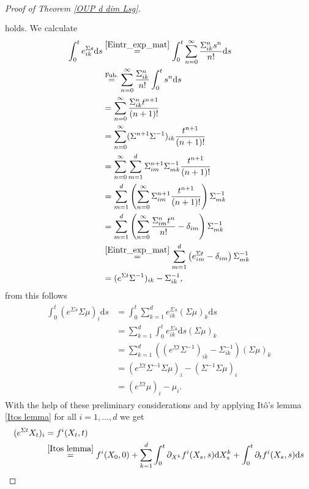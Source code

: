 \documentclass[11pt,titlepage]{article}
\theoremstyle{definition}
\theoremstyle{remark}
\begin{document}
\begin{proof}[Proof of Theorem \ref{OUP d dim Lsg}]
\begin{align}
\begin{split}
			\end{split}			
		\end{align}
		holds. We calculate
		\begin{align*}
			\int_0^t e^{\Sigma s}_{ik}\mathrm{d}s &\overset{\ref{Eintr_exp_mat}}{=} \int_0^t \sum_{n=0}^{\infty}\frac{\Sigma^n_{ik}s^n}{n!} \mathrm{d}s\\
			&\overset{\text{Fub.}}{=} \sum_{n=0}^{\infty}\frac{\Sigma^n_{ik}}{n!}\int_0^t s^n \mathrm{d}s\\
			&= \sum_{n=0}^{\infty}\frac{\Sigma^n_{ik}t^{n+1}}{(n+1)!}\\
			&= \sum_{n=0}^{\infty}(\Sigma^{n+1}\Sigma^{-1})_{ik}\frac{t^{n+1}}{(n+1)!}\\
			&= \sum_{n=0}^{\infty}\sum_{m=1}^d\Sigma^{n+1}_{im}\Sigma^{-1}_{mk}\frac{t^{n+1}}{(n+1)!}\\
			&= \sum_{m=1}^d\left(\sum_{n=0}^{\infty}\Sigma^{n+1}_{im}\frac{t^{n+1}}{(n+1)!}\right)\Sigma^{-1}_{mk}\\
			&= \sum_{m=1}^d\left(\sum_{n=0}^{\infty}\frac{\Sigma^{n}_{im}t^{n}}{n!}-\delta_{im}\right)\Sigma^{-1}_{mk}\\
			&\overset{\ref{Eintr_exp_mat}}{=} \sum_{m=1}^d\left(e^{\Sigma t}_{im}-\delta_{im}\right)\Sigma^{-1}_{mk}\\
			&= (e^{\Sigma t}\Sigma^{-1})_{ik} -\Sigma^{-1}_{ik},
		\end{align*}
		from this follows
		\begin{align}
			\begin{split}
				\int_0^t (e^{\Sigma s}\Sigma \mu)_i\mathrm{d}s
				&= \int_0^t \sum_{k=1}^d e^{\Sigma s}_{ik}(\Sigma\mu)_k\mathrm{d}s\\
				&= \sum_{k=1}^d \int_0^t e^{\Sigma s}_{ik} \mathrm{d}s (\Sigma\mu)_k\\
				&= \sum_{k=1}^d \left((e^{\Sigma t}\Sigma^{-1})_{ik} -\Sigma^{-1}_{ik}\right) (\Sigma\mu)_k\\
				&= (e^{\Sigma t}\Sigma^{-1}\Sigma\mu)_i -(\Sigma^{-1}\Sigma\mu)_i\\
				&= (e^{\Sigma t}\mu)_i -\mu_i. \label{NR:ito2}
			\end{split}
		\end{align}
		With the help of these preliminary considerations and by applying Itô's lemma \ref{Itos lemma} 
		for all $i=1,\ldots,d$ we get
		\begin{align*}
			(e^{\Sigma t}X_t)_i &= f^i(X_t,t) \\
			&\overset{\ref{Itos lemma}}{=} f^i(X_0,0) +\sum_{k=1}^d \int_0^t 
			\partial_{X^k} f^i(X_s,s)\mathrm{d}X^k_s +\int_0^t \partial_t f^i(X_s,s)\mathrm{d}s\\

\end{align*}
\end{proof}
\end{document}

